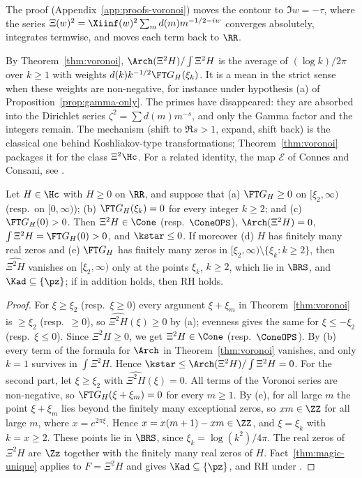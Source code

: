 The proof (Appendix~\ref{app:proofs-voronoi}) moves the contour to $\Im w=-\tau$, where the series
$\Xi(w)^2=\Xiinf(w)^2\sum_md(m)m^{-1/2-iw}$ converges absolutely, integrates termwise, and moves each term back
to $\RR$.

\begin{remark}\label{rem:wmean}
By Theorem~\ref{thm:voronoi}, $\Arch(\Xi^2H)/\int\Xi^2H$ is the average of $(\log k)/2\pi$ over $k\ge1$
with weights $d(k)k^{-1/2}\FT G_H(\xi_k)$. It is a mean in the strict sense when these weights are
non-negative, for instance under hypothesis (a) of Proposition~\ref{prop:gamma-only}. The primes have
disappeared: they are absorbed into the Dirichlet series $\zeta^2=\sum d(m)m^{-s}$, and only the
Gamma factor and the integers remain. The mechanism (shift to $\Re s>1$, expand, shift back) is the
classical one behind Koshliakov-type transformations; Theorem~\ref{thm:voronoi} packages it for the
class $\Xi^2\Hc$. For a related identity, the map $\mathcal E$ of Connes and Consani, see \cite{CC21}.
\end{remark}

\begin{proposition}\label{prop:gamma-only}
Let $H\in\Hc$ with $H\ge0$ on $\RR$, and suppose that
(a) $\FT G_H\ge0$ on $[\xi_2,\infty)$ (resp.\ on $[0,\infty)$);
(b) $\FT G_H(\xi_k)=0$ for every integer $k\ge2$; and
(c) $\FT G_H(0)>0$.
Then $\Xi^2H\in\Cone$ (resp.\ $\ConeOPS$), $\Arch(\Xi^2H)=0$, $\int\Xi^2H=\FT G_H(0)>0$, and
$\kstar\le0$. If moreover (d) $H$ has finitely many real zeros and (e) $\FT G_H$ has finitely many
zeros in $[\xi_2,\infty)\setminus\{\xi_k:k\ge2\}$, then $\widehat{\Xi^2H}$ vanishes on
$[\xi_2,\infty)$ only at the points $\xi_k$, $k\ge2$, which lie in $\BRS$, and
$\Kad\subseteq\{\pz\}$; if in addition \condE{} holds, then RH holds.
\end{proposition}

\begin{proof}
For $\xi\ge\xi_2$ (resp.\ $\xi\ge0$) every argument $\xi+\xi_m$ in Theorem~\ref{thm:voronoi} is
$\ge\xi_2$ (resp.\ $\ge0$), so $\widehat{\Xi^2H}(\xi)\ge0$ by (a); evenness gives the same for
$\xi\le-\xi_2$ (resp.\ $\xi\le0$). Since $\Xi^2H\ge0$, we get $\Xi^2H\in\Cone$ (resp.\ $\ConeOPS$).
By (b) every term of the formula for $\Arch$ in Theorem~\ref{thm:voronoi} vanishes, and only $k=1$
survives in $\int\Xi^2H$. Hence $\kstar\le\Arch(\Xi^2H)/\int\Xi^2H=0$.
For the second part, let $\xi\ge\xi_2$ with $\widehat{\Xi^2H}(\xi)=0$. All terms of the Voronoi series
are non-negative, so $\FT G_H(\xi+\xi_m)=0$ for every $m\ge1$. By (e), for all large $m$ the point
$\xi+\xi_m$ lies beyond the finitely many exceptional zeros, so $xm\in\ZZ$ for all large $m$, where
$x=e^{2\pi\xi}$. Hence $x=x(m+1)-xm\in\ZZ$, and $\xi=\xi_k$ with $k=x\ge2$. These points lie in
$\BRS$, since $\xi_k=\log(k^2)/4\pi$. The real zeros of $\Xi^2H$ are $\Zz$ together with the finitely
many real zeros of $H$. Fact~\ref{thm:magic-unique} applies to $F=\Xi^2H$ and gives
$\Kad\subseteq\{\pz\}$, and RH under \condE.
\end{proof}

